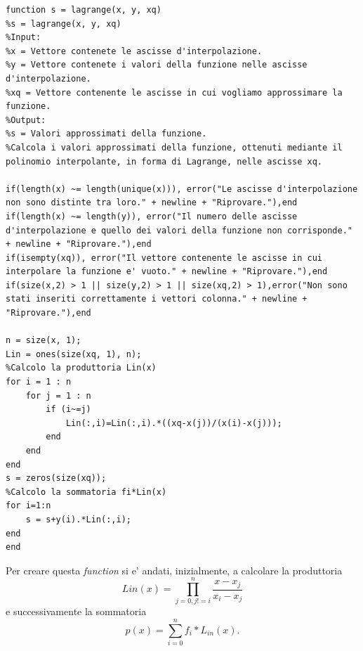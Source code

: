 \documentclass[10pt,a4paper]{article}
\begin{document}
\begin{lstlisting}[style=Matlab-editor]
function s = lagrange(x, y, xq)
%s = lagrange(x, y, xq)
%Input:
%x = Vettore contenete le ascisse d'interpolazione.
%y = Vettore contenete i valori della funzione nelle ascisse d'interpolazione.
%xq = Vettore contenente le ascisse in cui vogliamo approssimare la funzione.
%Output:
%s = Valori approssimati della funzione.
%Calcola i valori approssimati della funzione, ottenuti mediante il polinomio interpolante, in forma di Lagrange, nelle ascisse xq.
  
if(length(x) ~= length(unique(x))), error("Le ascisse d'interpolazione non sono distinte tra loro." + newline + "Riprovare."),end 
if(length(x) ~= length(y)), error("Il numero delle ascisse d'interpolazione e quello dei valori della funzione non corrisponde." + newline + "Riprovare."),end
if(isempty(xq)), error("Il vettore contenente le ascisse in cui interpolare la funzione e' vuoto." + newline + "Riprovare."),end
if(size(x,2) > 1 || size(y,2) > 1 || size(xq,2) > 1),error("Non sono stati inseriti correttamente i vettori colonna." + newline + "Riprovare."),end
   
n = size(x, 1);
Lin = ones(size(xq, 1), n);
%Calcolo la produttoria Lin(x)
for i = 1 : n
    for j = 1 : n
        if (i~=j)
            Lin(:,i)=Lin(:,i).*((xq-x(j))/(x(i)-x(j)));
        end
    end
end
s = zeros(size(xq));
%Calcolo la sommatoria fi*Lin(x)
for i=1:n
    s = s+y(i).*Lin(:,i);
end
end
\end{lstlisting}

Per creare questa \textit{function} si e' andati, inizialmente, a calcolare la 
produttoria \[ Lin(x) = \prod_{j = 0, j != i}^{n} \frac{x - x_j}{x_i - x_j} \]
e successivamente la sommatoria \[ p(x) = \sum_{i = 0}^{n} f_i * L_{in}(x). \]
\end{document}

